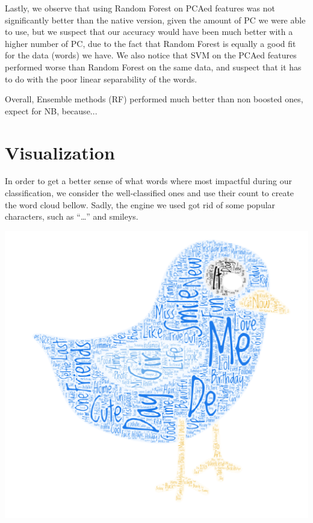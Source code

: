\documentclass[11pt,twocolumn]{report}
\begin{document}
    \par
    Lastly, we observe that using Random Forest on PCAed features was not significantly better than the native version, given the amount of PC we were able to use, but we suspect that our accuracy would have been much better with a higher number of PC, due to the fact that Random Forest is equally a good fit for the data (words) we have. We also notice that SVM on the PCAed features performed worse than Random Forest on the same data, and suspect that it has to do with the poor linear separability of the words.
    \par
    Overall, Ensemble methods (RF) performed much better than non boosted ones, expect for NB, because...

\section*{Visualization}
    In order to get a better sense of what words where most impactful during our classification, we consider the well-classified ones and use their count to create the word cloud bellow. Sadly, the engine we used got rid of some popular characters, such as ``\ldots'' and smileys.
    
    \begin{center}
        \includegraphics[scale=0.45]{cloud}
    \end{center}



\end{document}
